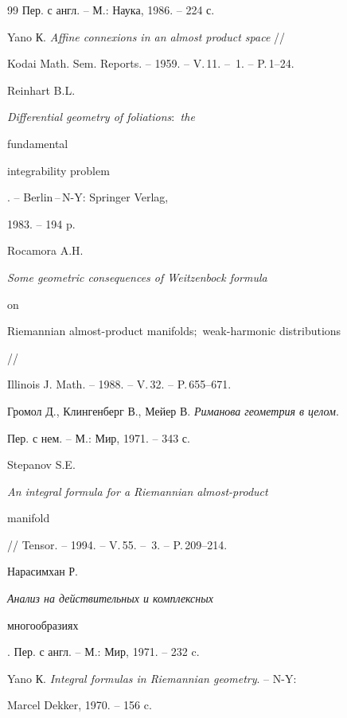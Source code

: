 \begin{thebibliography}{99}
Пер. с англ. -- М.: Наука, 1986. -- 224 с. 




Yano К. {\em Affine connexions in an almost product space} // 


Kodai Math. Sem. Reports. -- 1959. -- V.\,11. -- \No\,1. -- P.\,1--24. 




Reinhart B.L. {\em Differential geometry of foliations$:$ the 


fundamental 


integrability problem}. -- Berlin\,--\,N-Y: Springer Verlag, 


1983. -- 194 p. 




Rocamora A.H. {\em Some geometric consequences of Weitzenbock formula 


on 


Riemannian almost-product manifolds$;$ weak-harmonic distributions} // 


Illinois J. Math. -- 1988. -- V.\,32. -- P.\,655--671. 




Громол Д., Клингенберг В., Мейер В. {\em Риманова геометрия в целом}. 


Пер. с нем. -- М.: Мир, 1971. -- 343 с. 




Stepanov S.E. {\em An integral formula for a Riemannian almost-product 


manifold} // Tensor. -- 1994. -- V.\,55. -- \No\,3. -- P.\,209--214. 




Нарасимхан Р. {\em Анализ на действительных и комплексных 


многообразиях}. Пер. с англ. -- М.: Мир, 1971. -- 232 c. 




Yano К. {\em Integral formulas in Riemannian geometry}. -- N-Y: 


Marcel Dekker, 1970. -- 156 c. 


 


\end{thebibliography} 


 


\vskip 2cm 


 






 


\label{end} 


 


 


